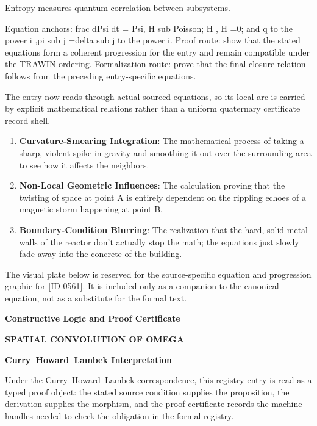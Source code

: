 Entropy measures quantum correlation between subsystems.

Equation anchors: frac dPsi dt = Psi, H sub Poisson; H , H =0; and q to the power i ,pi sub j =delta sub j to the power i. Proof route: show that the stated equations form a coherent progression for the entry and remain compatible under the TRAWIN ordering. Formalization route: prove that the final closure relation follows from the preceding entry-specific equations.

The entry now reads through actual sourced equations, so its local arc is carried by explicit mathematical relations rather than a uniform quaternary certificate record shell.
\endgroup

\begin{enumerate}[leftmargin=1.6em,itemsep=6pt,topsep=4pt]
\item \textbf{Curvature-Smearing Integration}: The mathematical process of taking a sharp, violent spike in gravity and smoothing it out over the surrounding area to see how it affects the neighbors.
\item \textbf{Non-Local Geometric Influences}: The calculation proving that the twisting of space at point A is entirely dependent on the rippling echoes of a magnetic storm happening at point B.
\item \textbf{Boundary-Condition Blurring}: The realization that the hard, solid metal walls of the reactor don't actually stop the math; the equations just slowly fade away into the concrete of the building.
\end{enumerate}

\begingroup\footnotesize\sloppy
The visual plate below is reserved for the source-specific equation and progression graphic for [ID 0561]. It is included only as a companion to the canonical equation, not as a substitute for the formal text.
\par\endgroup
\ifTZPDarkEdition
{}
\fi

\clearpage
\begingroup\tzpsupportsetup
\noindent\textbf{\fontsize{10.8pt}{12.8pt}\selectfont [ID 0561] Constructive Logic and Proof Certificate}\par
\noindent\textbf{\fontsize{10pt}{12pt}\selectfont SPATIAL CONVOLUTION OF OMEGA}\par
\vspace{0.45em}
\begingroup
\footnotesize
\setlength{\parskip}{0.22em}
\setlength{\parindent}{0pt}
\noindent\textbf{Curry--Howard--Lambek Interpretation}\par
Under the Curry--Howard--Lambek correspondence, this registry entry is read as a typed proof
object: the stated source condition supplies the proposition, the derivation supplies the
morphism, and the proof certificate records the machine handles needed to check the obligation
in the formal registry.

